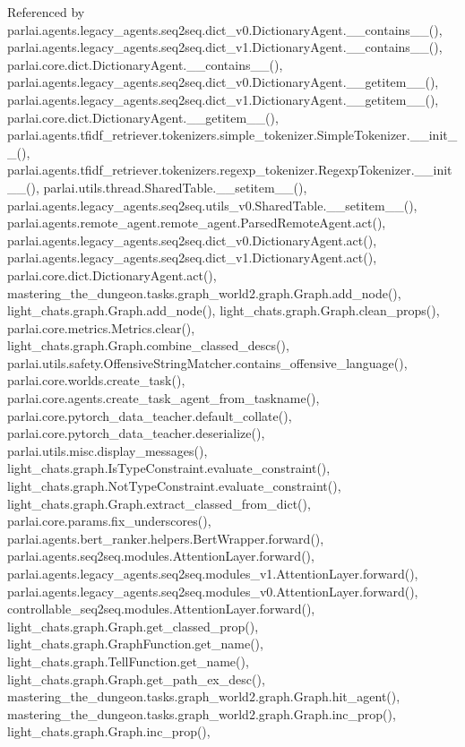 Referenced by parlai.\+agents.\+legacy\+\_\+agents.\+seq2seq.\+dict\+\_\+v0.\+Dictionary\+Agent.\+\_\+\+\_\+contains\+\_\+\+\_\+(), parlai.\+agents.\+legacy\+\_\+agents.\+seq2seq.\+dict\+\_\+v1.\+Dictionary\+Agent.\+\_\+\+\_\+contains\+\_\+\+\_\+(), parlai.\+core.\+dict.\+Dictionary\+Agent.\+\_\+\+\_\+contains\+\_\+\+\_\+(), parlai.\+agents.\+legacy\+\_\+agents.\+seq2seq.\+dict\+\_\+v0.\+Dictionary\+Agent.\+\_\+\+\_\+getitem\+\_\+\+\_\+(), parlai.\+agents.\+legacy\+\_\+agents.\+seq2seq.\+dict\+\_\+v1.\+Dictionary\+Agent.\+\_\+\+\_\+getitem\+\_\+\+\_\+(), parlai.\+core.\+dict.\+Dictionary\+Agent.\+\_\+\+\_\+getitem\+\_\+\+\_\+(), parlai.\+agents.\+tfidf\+\_\+retriever.\+tokenizers.\+simple\+\_\+tokenizer.\+Simple\+Tokenizer.\+\_\+\+\_\+init\+\_\+\+\_\+(), parlai.\+agents.\+tfidf\+\_\+retriever.\+tokenizers.\+regexp\+\_\+tokenizer.\+Regexp\+Tokenizer.\+\_\+\+\_\+init\+\_\+\+\_\+(), parlai.\+utils.\+thread.\+Shared\+Table.\+\_\+\+\_\+setitem\+\_\+\+\_\+(), parlai.\+agents.\+legacy\+\_\+agents.\+seq2seq.\+utils\+\_\+v0.\+Shared\+Table.\+\_\+\+\_\+setitem\+\_\+\+\_\+(), parlai.\+agents.\+remote\+\_\+agent.\+remote\+\_\+agent.\+Parsed\+Remote\+Agent.\+act(), parlai.\+agents.\+legacy\+\_\+agents.\+seq2seq.\+dict\+\_\+v0.\+Dictionary\+Agent.\+act(), parlai.\+agents.\+legacy\+\_\+agents.\+seq2seq.\+dict\+\_\+v1.\+Dictionary\+Agent.\+act(), parlai.\+core.\+dict.\+Dictionary\+Agent.\+act(), mastering\+\_\+the\+\_\+dungeon.\+tasks.\+graph\+\_\+world2.\+graph.\+Graph.\+add\+\_\+node(), light\+\_\+chats.\+graph.\+Graph.\+add\+\_\+node(), light\+\_\+chats.\+graph.\+Graph.\+clean\+\_\+props(), parlai.\+core.\+metrics.\+Metrics.\+clear(), light\+\_\+chats.\+graph.\+Graph.\+combine\+\_\+classed\+\_\+descs(), parlai.\+utils.\+safety.\+Offensive\+String\+Matcher.\+contains\+\_\+offensive\+\_\+language(), parlai.\+core.\+worlds.\+create\+\_\+task(), parlai.\+core.\+agents.\+create\+\_\+task\+\_\+agent\+\_\+from\+\_\+taskname(), parlai.\+core.\+pytorch\+\_\+data\+\_\+teacher.\+default\+\_\+collate(), parlai.\+core.\+pytorch\+\_\+data\+\_\+teacher.\+deserialize(), parlai.\+utils.\+misc.\+display\+\_\+messages(), light\+\_\+chats.\+graph.\+Is\+Type\+Constraint.\+evaluate\+\_\+constraint(), light\+\_\+chats.\+graph.\+Not\+Type\+Constraint.\+evaluate\+\_\+constraint(), light\+\_\+chats.\+graph.\+Graph.\+extract\+\_\+classed\+\_\+from\+\_\+dict(), parlai.\+core.\+params.\+fix\+\_\+underscores(), parlai.\+agents.\+bert\+\_\+ranker.\+helpers.\+Bert\+Wrapper.\+forward(), parlai.\+agents.\+seq2seq.\+modules.\+Attention\+Layer.\+forward(), parlai.\+agents.\+legacy\+\_\+agents.\+seq2seq.\+modules\+\_\+v1.\+Attention\+Layer.\+forward(), parlai.\+agents.\+legacy\+\_\+agents.\+seq2seq.\+modules\+\_\+v0.\+Attention\+Layer.\+forward(), controllable\+\_\+seq2seq.\+modules.\+Attention\+Layer.\+forward(), light\+\_\+chats.\+graph.\+Graph.\+get\+\_\+classed\+\_\+prop(), light\+\_\+chats.\+graph.\+Graph\+Function.\+get\+\_\+name(), light\+\_\+chats.\+graph.\+Tell\+Function.\+get\+\_\+name(), light\+\_\+chats.\+graph.\+Graph.\+get\+\_\+path\+\_\+ex\+\_\+desc(), mastering\+\_\+the\+\_\+dungeon.\+tasks.\+graph\+\_\+world2.\+graph.\+Graph.\+hit\+\_\+agent(), mastering\+\_\+the\+\_\+dungeon.\+tasks.\+graph\+\_\+world2.\+graph.\+Graph.\+inc\+\_\+prop(), light\+\_\+chats.\+graph.\+Graph.\+inc\+\_\+prop(), 